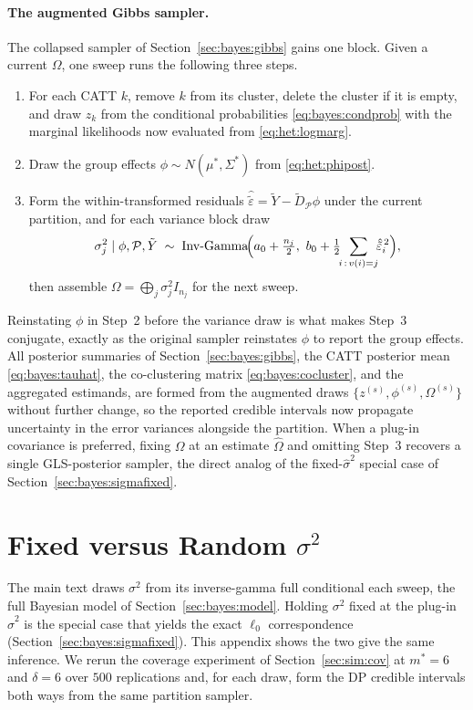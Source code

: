 \documentclass[margin=5in, 12pt]{article}
\newcommand{\1}{\mathbbm{1}}
\begin{document}
\paragraph{The augmented Gibbs sampler.} The collapsed sampler of Section~\ref{sec:bayes:gibbs} gains one block. Given a current $\Omega$, one sweep runs the following three steps.
\begin{enumerate}
\item For each CATT $k$, remove $k$ from its cluster, delete the cluster if it is empty, and draw $z_k$ from the conditional probabilities \eqref{eq:bayes:condprob} with the marginal likelihoods now evaluated from \eqref{eq:het:logmarg}.
\item Draw the group effects $\phi \sim N(\mu^*,\Sigma^*)$ from \eqref{eq:het:phipost}.
\item Form the within-transformed residuals $\hat{\tilde\varepsilon} = \tilde Y - \tilde D_{\mathcal P}\phi$ under the current partition, and for each variance block draw
\begin{equation}
  \sigma_j^2 \mid \phi,\mathcal P,\tilde Y \;\sim\; \mathrm{Inv\text{-}Gamma}\!\Bigl(a_0+\tfrac{n_j}{2},\ b_0+\tfrac12\!\!\sum_{i\,:\,v(i)=j}\!\!\hat{\tilde\varepsilon}_i^{\,2}\Bigr),
  \label{eq:het:sigma}
\end{equation}
then assemble $\Omega=\bigoplus_j\sigma_j^2 I_{n_j}$ for the next sweep.
\end{enumerate}
Reinstating $\phi$ in Step~2 before the variance draw is what makes Step~3 conjugate, exactly as the original sampler reinstates $\phi$ to report the group effects. All posterior summaries of Section~\ref{sec:bayes:gibbs}, the CATT posterior mean \eqref{eq:bayes:tauhat}, the co-clustering matrix \eqref{eq:bayes:cocluster}, and the aggregated estimands, are formed from the augmented draws $\{z^{(s)},\phi^{(s)},\Omega^{(s)}\}$ without further change, so the reported credible intervals now propagate uncertainty in the error variances alongside the partition. When a plug-in covariance is preferred, fixing $\Omega$ at an estimate $\hat\Omega$ and omitting Step~3 recovers a single GLS-posterior sampler, the direct analog of the fixed-$\hat\sigma^2$ special case of Section~\ref{sec:bayes:sigmafixed}.

\section{Fixed versus Random $\sigma^{2}$}
\label{app:sigma}

The main text draws $\sigma^{2}$ from its inverse-gamma full conditional each sweep, the full Bayesian model of Section~\ref{sec:bayes:model}. Holding $\sigma^{2}$ fixed at the plug-in $\hat\sigma^{2}$ is the special case that yields the exact $\ell_0$ correspondence (Section~\ref{sec:bayes:sigmafixed}). This appendix shows the two give the same inference. We rerun the coverage experiment of Section~\ref{sec:sim:cov} at $m^{\ast}=6$ and $\delta=6$ over $500$ replications and, for each draw, form the DP credible intervals both ways from the same partition sampler.
\end{document}
